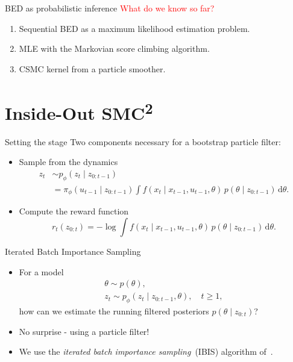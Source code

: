 \documentclass[10pt, aspectratio=1610]{beamer}
\newcommand{\dd}{\mathrm{d}}
\begin{document}
    \begin{frame}{BED as probabilistic inference}
      \textcolor{red}{\large What do we know so far?}\vspace{0.1cm}
      \begin{enumerate}
        \item<2-> Sequential BED as a maximum likelihood estimation problem.
        \item<3-> MLE with the Markovian score climbing algorithm.
        \item<4-> CSMC kernel from a particle smoother.
      \end{enumerate}

      \vspace{0.3cm}
    \end{frame}

  \section{Inside-Out \texorpdfstring{SMC\textsuperscript{2}}{SMC2}}
    \begin{frame}{Setting the stage}
      Two components necessary for a bootstrap particle filter:
      \begin{itemize}[<+->]
        \item Sample from the dynamics
          \begin{align}
            z_t &\sim p_\phi(z_t \mid z_{0:t-1}) \\
            &= \pi_\phi(u_{t-1} \mid z_{0:t-1}) \int f(x_t \mid x_{t-1}, u_{t-1}, \theta) \, p(\theta \mid z_{0:t-1}) \, \dd \theta.
          \end{align}
        \item Compute the reward function
          \begin{equation}
            r_t(z_{0:t}) = - \log \int f(x_t \mid x_{t-1}, u_{t-1}, \theta) \, p(\theta \mid z_{0:t-1}) \, \dd \theta.
          \end{equation}
      \end{itemize}
    \end{frame}

    \begin{frame}{Iterated Batch Importance Sampling}
      \begin{itemize}[<+->]
        \item For a model
          \begin{gather}
            \theta \sim p(\theta), \\
            z_t \sim p_\phi(z_t \mid z_{0:t-1}, \theta), \quad t \geq 1,
          \end{gather}
          how can we estimate the running filtered posteriors $p(\theta \mid z_{0:t})$?
        \item No surprise - using a particle filter!
        \item We use the \emph{iterated batch importance sampling}~(IBIS) algorithm of~\citet{chopin2002sequential}.
      \end{itemize}
    \end{frame}
\end{document}
